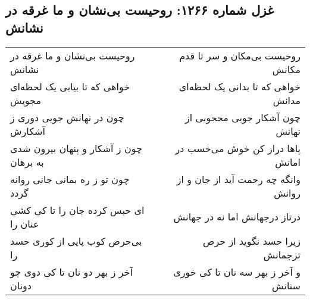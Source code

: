 \begin{center}
\section*{غزل شماره ۱۲۶۶: روحیست بی‌نشان و ما غرقه در نشانش}
\label{sec:1266}
\begin{longtable}{l p{0.5cm} r}
روحیست بی‌نشان و ما غرقه در نشانش
&&
روحیست بی‌مکان و سر تا قدم مکانش
\\
خواهی که تا بیابی یک لحظه‌ای مجویش
&&
خواهی که تا بدانی یک لحظه‌ای مدانش
\\
چون در نهانش جویی دوری ز آشکارش
&&
چون آشکار جویی محجوبی از نهانش
\\
چون ز آشکار و پنهان بیرون شدی به برهان
&&
پاها دراز کن خوش می‌خسب در امانش
\\
چون تو ز ره بمانی جانی روانه گردد
&&
وانگه چه رحمت آید از جان و از روانش
\\
ای حبس کرده جان را تا کی کشی عنان را
&&
درتاز درجهانش اما نه در جهانش
\\
بی‌حرص کوب پایی از کوری حسد را
&&
زیرا حسد نگوید از حرص ترجمانش
\\
آخر ز بهر دو نان تا کی دوی چو دونان
&&
و آخر ز بهر سه نان تا کی خوری سنانش
\\
\end{longtable}
\end{center}
